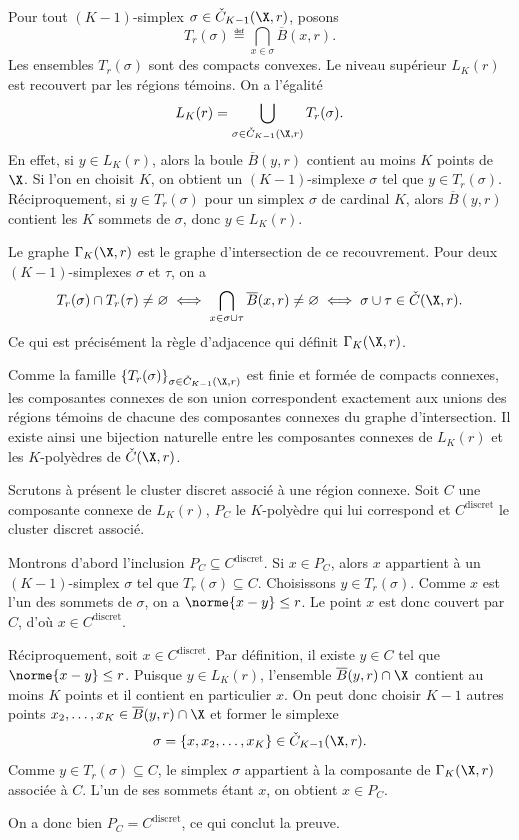 \begin{Preuve}
Pour tout $(K-1)$-simplex $\sigma\in \check C_{K-1}(\X,r)$, posons
\[
    T_r(\sigma) \eqdef \bigcap_{x\in \sigma}\overline B(x,r).
\]
Les ensembles $T_r(\sigma)$ sont des compacts convexes.
{Le niveau supérieur $L_K(r)$ est recouvert par les régions témoins.}
On a l'égalité
\[
    L_K(r)=\bigcup_{\sigma\in\check C_{K-1}(\X,r)} T_r(\sigma).
\]
En effet, si $y\in L_K(r)$, alors la boule $\overline B(y,r)$ contient au moins $K$ points de $\X$. Si l'on en choisit $K$, on obtient un $(K-1)$-simplexe $\sigma$ tel que $y\in T_r(\sigma)$. Réciproquement, si $y\in T_r(\sigma)$ pour un simplex $\sigma$ de cardinal $K$, alors $\overline B(y,r)$ contient les $K$ sommets de $\sigma$, donc $y\in L_K(r)$.

{Le graphe $\Gamma_K(\X,r)$ est le graphe d'intersection de ce recouvrement.}
Pour deux $(K-1)$-simplexes $\sigma$ et $\tau$, on a
\[
    T_r(\sigma)\cap T_r(\tau)\neq \varnothing
    \iff \bigcap_{x\in \sigma\cup\tau}\overline B(x,r)\neq \varnothing
    \iff \sigma\cup\tau\in \check C(\X,r).
\]
Ce qui est précisément la règle d'adjacence qui définit $\Gamma_K(\X,r)$.

Comme la famille $\{T_r(\sigma)\}_{\sigma\in\check C_{K-1}(\X,r)}$ est finie et formée de compacts connexes, les composantes connexes de son union correspondent exactement aux unions des régions témoins de chacune des composantes connexes du graphe d'intersection. 
Il existe ainsi une bijection naturelle entre les composantes connexes de $L_K(r)$ et les $K$-polyèdres de $\check C(\X,r)$.

Scrutons à présent le cluster discret associé à une région connexe.
Soit $C$ une composante connexe de $L_K(r)$, $P_C$ le $K$-polyèdre qui lui correspond et $C^{\mathrm{discret}}$ le cluster discret associé.

Montrons d'abord l'inclusion $P_C\subseteq C^{\mathrm{discret}}$. Si $x\in P_C$, alors $x$ appartient à un $(K-1)$-simplex $\sigma$ tel que $T_r(\sigma)\subseteq C$. Choisissons $y\in T_r(\sigma)$. Comme $x$ est l'un des sommets de $\sigma$, on a $\norme{x-y}\le r$. Le point $x$ est donc couvert par $C$, d'où $x\in C^{\mathrm{discret}}$.

Réciproquement, soit $x\in C^{\mathrm{discret}}$. Par définition, il existe $y\in C$ tel que $\norme{x-y}\le r$. Puisque $y\in L_K(r)$, l'ensemble $\overline B(y,r)\cap \X$ contient au moins $K$ points et il contient en particulier $x$. On peut donc choisir $K-1$ autres points $x_2,\ldots,x_K\in \overline B(y,r)\cap \X$ et former le simplexe
\[
    \sigma = \{x,x_2,\ldots,x_K\}\in \check C_{K-1}(\X,r).
\]
Comme $y\in T_r(\sigma)\subseteq C$, le simplex $\sigma$ appartient à la composante de $\Gamma_K(\X,r)$ associée à $C$. L'un de ses sommets étant $x$, on obtient $x\in P_C$.

On a donc bien $P_C=C^{\mathrm{discret}}$, ce qui conclut la preuve.
\end{Preuve}



